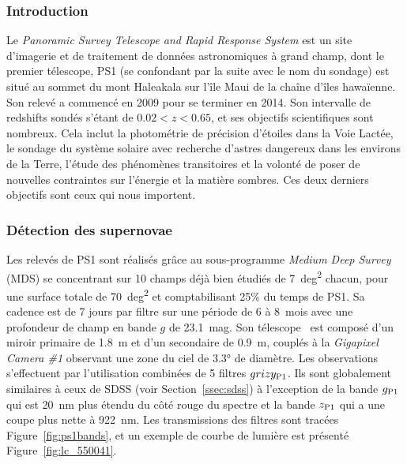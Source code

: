 \documentclass[../main/main.tex]{subfiles}
\begin{document}
\subsubsection{Introduction}\label{sssec:ps1intro}

Le \textit{Panoramic Survey Telescope and Rapid Response System}
\citep[Pan-STARRS,][]{chambers2016, scolnic2018} est un site d'imagerie et de
traitement de données astronomiques à grand champ, dont le premier télescope,
PS1 (se confondant par la suite avec le nom du sondage) est situé au sommet du
mont Haleakala sur l'île Maui de la chaîne d'îles hawaïenne. Son relevé a
commencé en 2009 pour se terminer en 2014. Son intervalle de redshifts sondés
s'étant de $0.02 < z < 0.65$, et ses objectifs scientifiques sont nombreux. Cela
inclut la photométrie de précision d'étoiles dans la Voie Lactée, le sondage du
système solaire avec recherche d'astres dangereux dans les environs de la Terre,
l'étude des phénomènes transitoires et la volonté de poser de nouvelles
contraintes sur l'énergie et la matière sombres. Ces deux derniers objectifs
sont ceux qui nous importent. 

\subsubsection{Détection des supernovae}\label{sssec:ps1detec}

Les relevés de PS1 sont réalisés grâce au sous-programme \textit{Medium Deep
Survey} (MDS) se concentrant sur 10 champs déjà bien étudiés de \SI{7}{deg^2}
chacun, pour une surface totale de \SI{70}{deg^2} et comptabilisant 25\% du
temps de PS1. Sa cadence est de 7 jours par filtre sur une période de 6 à
\SI{8}{mois} avec une profondeur de champ en bande $g$ de \SI{23.1}{mag}. Son
télescope~\citep{hodapp2004} est composé d'un miroir primaire de \SI{1.8}{m} et
d'un secondaire de \SI{0.9}{m}, couplés à la \textit{Gigapixel Camera \#1}
\citep[GPC1,][]{kaiser2010, tonry2006} observant une zone du ciel de \ang{3.3;;}
de diamètre. Les observations s'effectuent par l'utilisation combinées de 5
filtres $grizy_{\rm P1}$. Ils sont globalement similaires à ceux de SDSS (voir
Section~\ref{ssec:sdss}) à l'exception de la bande $g_{\rm P1}$ qui est
\SI{20}{nm} plus étendu du côté rouge du spectre et la bande $z_{\rm P1}$ qui a
une coupe plus nette à \SI{922}{nm}. Les transmissions des filtres sont tracées
Figure~\ref{fig:ps1bands}, et un exemple de courbe de lumière est présenté
Figure~\ref{fig:lc_550041}.
\end{document}

